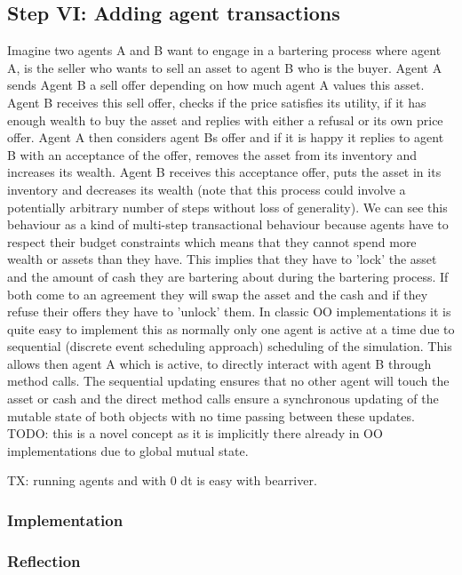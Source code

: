 \subsection{Step VI: Adding agent transactions}
Imagine two agents A and B want to engage in a bartering process where agent A, is the seller who wants to sell an asset to agent B who is the buyer. Agent A sends Agent B a sell offer depending on how much agent A values this asset. Agent B receives this sell offer, checks if the price satisfies its utility, if it has enough wealth to buy the asset and replies with either a refusal or its own price offer. Agent A then considers agent Bs offer and if it is happy it replies to agent B with an acceptance of the offer, removes the asset from its inventory and increases its wealth. Agent B receives this acceptance offer, puts the asset in its inventory and decreases its wealth (note that this process could involve a potentially arbitrary number of steps without loss of generality).
We can see this behaviour as a kind of multi-step transactional behaviour because agents have to respect their budget constraints which means that they cannot spend more wealth or assets than they have. This implies that they have to 'lock' the asset and the amount of cash they are bartering about during the bartering process. If both come to an agreement they will swap the asset and the cash and if they refuse their offers they have to 'unlock' them.
In classic OO implementations it is quite easy to implement this as normally only one agent is active at a time due to sequential (discrete event scheduling approach) scheduling of the simulation. This allows then agent A which is active, to directly interact with agent B through method calls. The sequential updating ensures that no other agent will touch the asset or cash and the direct method calls ensure a synchronous updating of the mutable state of both objects with no time passing between these updates.
TODO: this is a novel concept as it is implicitly there already in OO implementations due to global mutual state.

TX: running agents and with 0 dt is easy with bearriver.

\subsubsection{Implementation}

\subsubsection{Reflection}